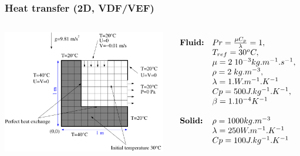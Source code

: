 \documentclass[10pt, hyperref={unicode=true,pdfusetitle, bookmarks=true,bookmarksnumbered=false,bookmarksopen=false, breaklinks=false,pdfborder={0 0 1},backref=true,colorlinks=true,linkcolor=darkblue,pageanchor}]{beamer}
\begin{document}
\begin{frame}
\frametitle{Heat transfer (2D, VDF/VEF)}
\begin{block}{}


\begin{columns}[c] 
\begin{center}
\includegraphics[width=1.\textwidth]{PICTURES/heat_exchange.pdf}
\end{center}

$$
\begin{array}{ll}
\mbox{\textbf{Fluid:}}      & Pr=\frac{\mu C_p}{\lambda}=1, \\
                            & T_{ref}=30^o C,\\
                            & \mu=2 \; 10^{-3} kg.m^{-1}.s^{-1},\\
                            & \rho=2 \; kg.m^{-3},\\
                            & \lambda=1. W.m^{-1}.K^{-1} \\
                            & Cp=500 J.kg^{-1}.K^{-1},\\
                            & \beta=1.10^{-4} K^{-1} \\
                            &  \\
\mbox{\textbf{Solid:}}      & \rho=1000 kg.m^{-3} \\
                            & \lambda=250 W.m^{-1}.K^{-1} \\
                            & Cp=100 J.kg^{-1}.K^{-1}
\end{array}
$$

\end{columns}

\end{block}
\end{frame}
\end{document}
